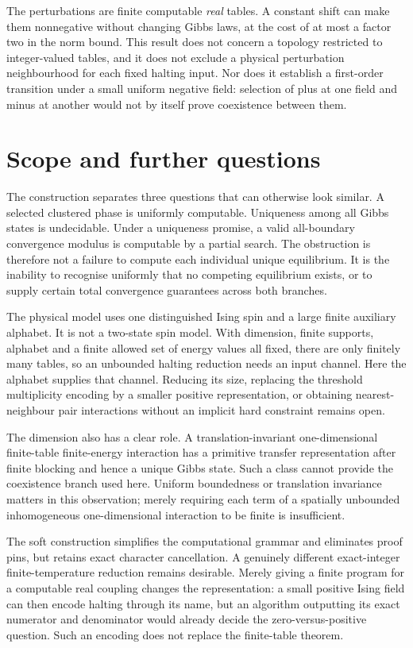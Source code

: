 \documentclass[11pt,reqno]{amsart}
\numberwithin{equation}{section}
\theoremstyle{definition}
\theoremstyle{remark}
\begin{document}
The perturbations are finite computable \emph{real} tables. A constant shift can make them nonnegative without changing Gibbs laws, at the cost of at most a factor two in the norm bound. This result does not concern a topology restricted to integer-valued tables, and it does not exclude a physical perturbation neighbourhood for each fixed halting input. Nor does it establish a first-order transition under a small uniform negative field: selection of plus at one field and minus at another would not by itself prove coexistence between them.


\section{Scope and further questions}\label{sec:discussion}

The construction separates three questions that can otherwise look similar. A selected clustered phase is uniformly computable. Uniqueness among all Gibbs states is undecidable. Under a uniqueness promise, a valid all-boundary convergence modulus is computable by a partial search. The obstruction is therefore not a failure to compute each individual unique equilibrium. It is the inability to recognise uniformly that no competing equilibrium exists, or to supply certain total convergence guarantees across both branches.

The physical model uses one distinguished Ising spin and a large finite auxiliary alphabet. It is not a two-state spin model. With dimension, finite supports, alphabet and a finite allowed set of energy values all fixed, there are only finitely many tables, so an unbounded halting reduction needs an input channel. Here the alphabet supplies that channel. Reducing its size, replacing the threshold multiplicity encoding by a smaller positive representation, or obtaining nearest-neighbour pair interactions without an implicit hard constraint remains open.

The dimension also has a clear role. A translation-invariant one-dimensional finite-table finite-energy interaction has a primitive transfer representation after finite blocking and hence a unique Gibbs state. Such a class cannot provide the coexistence branch used here. Uniform boundedness or translation invariance matters in this observation; merely requiring each term of a spatially unbounded inhomogeneous one-dimensional interaction to be finite is insufficient.

The soft construction simplifies the computational grammar and eliminates proof pins, but retains exact character cancellation. A genuinely different exact-integer finite-temperature reduction remains desirable. Merely giving a finite program for a computable real coupling changes the representation: a small positive Ising field can then encode halting through its name, but an algorithm outputting its exact numerator and denominator would already decide the zero-versus-positive question. Such an encoding does not replace the finite-table theorem.
\end{document}
